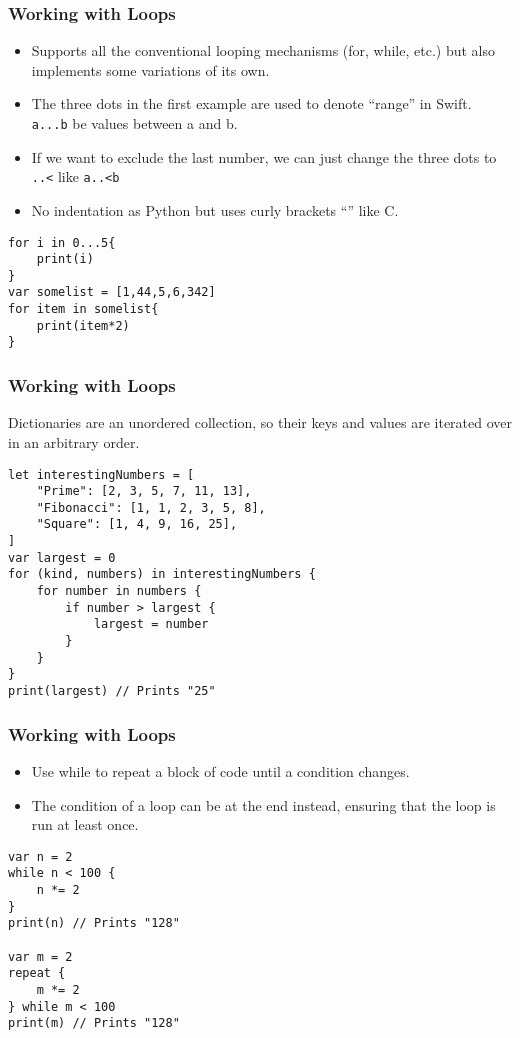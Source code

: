 \begin{frame}[fragile] \frametitle{Working with Loops}

\begin{itemize}
\item Supports all the conventional looping mechanisms (for, while, etc.) but also implements some variations of its own.
\item The three dots in the first example are used to denote ``range'' in Swift. \lstinline|a...b| be values between a and b.
\item If we want to exclude the last number, we can just change the three dots to \lstinline|..<| like \lstinline|a..<b|
\item No indentation as Python but uses curly brackets ``{}'' like C.
\end{itemize}

\begin{lstlisting}[basicstyle=\scriptsize]
for i in 0...5{
	print(i)
}
var somelist = [1,44,5,6,342]
for item in somelist{
	print(item*2)
}
\end{lstlisting}
\end{frame}


\begin{frame}[fragile] \frametitle{Working with Loops}

Dictionaries are an unordered collection, so their keys and values are iterated over in an arbitrary order.

\begin{lstlisting}[basicstyle=\scriptsize]
let interestingNumbers = [
    "Prime": [2, 3, 5, 7, 11, 13],
    "Fibonacci": [1, 1, 2, 3, 5, 8],
    "Square": [1, 4, 9, 16, 25],
]
var largest = 0
for (kind, numbers) in interestingNumbers {
    for number in numbers {
        if number > largest {
            largest = number
        }
    }
}
print(largest) // Prints "25"
\end{lstlisting}
\end{frame}

\begin{frame}[fragile] \frametitle{Working with Loops}

\begin{itemize}
\item Use while to repeat a block of code until a condition changes. 
\item The condition of a loop can be at the end instead, ensuring that the loop is run at least once.
\end{itemize}

\begin{lstlisting}[basicstyle=\scriptsize]
var n = 2
while n < 100 {
    n *= 2
}
print(n) // Prints "128"

var m = 2
repeat {
    m *= 2
} while m < 100
print(m) // Prints "128"
\end{lstlisting}
\end{frame}

